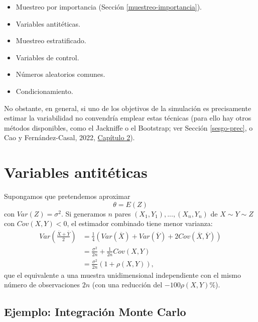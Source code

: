 \documentclass[
]{book}
\theoremstyle{break}
\theoremstyle{nonumberplain}
\begin{document}
\begin{itemize}
\item
  Muestreo por importancia (Sección \ref{muestreo-importancia}).
\item
  Variables antitéticas.
\item
  Muestreo estratificado.
\item
  Variables de control.
\item
  Números aleatorios comunes.
\item
  Condicionamiento.
\end{itemize}

No obstante, en general, si uno de los objetivos de la simulación es precisamente estimar la variabilidad no convendría emplear estas técnicas
(para ello hay otros métodos disponibles, como el Jackniffe o el Bootstrap; ver Sección \ref{sesgo-prec}, o Cao y Fernández-Casal, 2022, \href{https://rubenfcasal.github.io/book_remuestreo/prec-sesgo.html}{Capítulo 2}).

\hypertarget{variables-antituxe9ticas}{%
\section{Variables antitéticas}\label{variables-antituxe9ticas}}

Supongamos que pretendemos aproximar
\[\theta=E\left(  Z\right)\]
con \(Var\left( Z \right) = \sigma^{2}\).
Si generamos \(n\) pares
\(\left( X_{1},Y_{1}\right), ... ,\left( X_{n},Y_{n}\right)\)
de \(X\sim Y\sim Z\) con \(Cov\left( X,Y\right) < 0\),
el estimador combinado tiene menor varianza:
\[\begin{aligned}
    Var\left(  \frac{\overline{X}+\overline{Y}}{2}\right)   & =\frac{1}{4}\left(
    Var\left(  \overline{X}\right)  +Var\left(  \overline{Y}\right)  +2Cov\left(
    \overline{X},\overline{Y}\right)  \right) \\
    & =\frac{\sigma^{2}}{2n}+\frac{1}{2n}Cov\left(  X,Y\right) \\
    & =\frac{\sigma^{2}}{2n}\left(  1+\rho \left(  X,Y\right)  \right),
\end{aligned}\]
que el equivalente a una muestra unidimensional independiente con el
mismo número de observaciones \(2n\) (con una reducción del
\(-100\rho \left( X,Y\right) \%\)).

\hypertarget{ejemplo-integraciuxf3n-monte-carlo}{%
\subsection{Ejemplo: Integración Monte Carlo}\label{ejemplo-integraciuxf3n-monte-carlo}}
\end{document}
